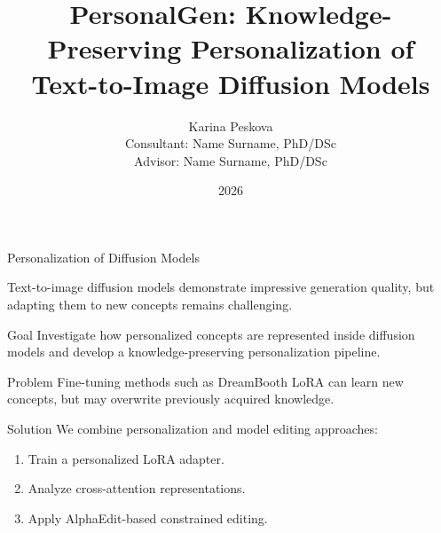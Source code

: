 \documentclass[aspectratio=169]{beamer}
\title{PersonalGen: Knowledge-Preserving Personalization of\\
Text-to-Image Diffusion Models}
\author{
    Karina Peskova\\
    Consultant: Name Surname, PhD/DSc\\
    Advisor: Name Surname, PhD/DSc
}
\institute{
    Diploma Research Project\\
    Lomonosov Moscow State University
}
\date{2026}
\begin{document}

\begin{frame}
    \thispagestyle{empty}
    \maketitle
\end{frame}



\begin{frame}{Personalization of Diffusion Models}

Text-to-image diffusion models demonstrate impressive generation quality,
but adapting them to new concepts remains challenging.

\begin{block}{Goal}
Investigate how personalized concepts are represented inside diffusion models
and develop a knowledge-preserving personalization pipeline.
\end{block}


\begin{block}{Problem}
Fine-tuning methods such as DreamBooth LoRA can learn new concepts,
but may overwrite previously acquired knowledge.
\end{block}


\begin{block}{Solution}
We combine personalization and model editing approaches:

\begin{enumerate}[1)]
    \item Train a personalized LoRA adapter.
    \item Analyze cross-attention representations.
    \item Apply AlphaEdit-based constrained editing.
\end{enumerate}

\end{block}

\end{frame}


\end{document}
